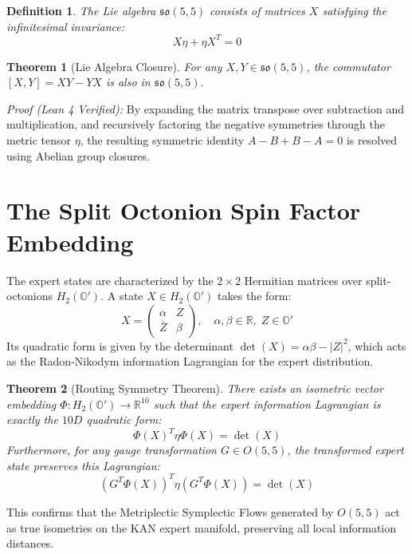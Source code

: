\documentclass[12pt,a4paper]{article}
\newtheorem{theorem}{Theorem}
\newtheorem{definition}{Definition}
\begin{document}
\begin{definition}
The Lie algebra $\mathfrak{so}(5,5)$ consists of matrices $X$ satisfying the infinitesimal invariance:
\begin{equation}
X \eta + \eta X^T = 0
\end{equation}
\end{definition}

\begin{theorem}[Lie Algebra Closure]
For any $X, Y \in \mathfrak{so}(5,5)$, the commutator $[X, Y] = XY - YX$ is also in $\mathfrak{so}(5,5)$.
\end{theorem}
\textit{Proof (Lean 4 Verified):} By expanding the matrix transpose over subtraction and multiplication, and recursively factoring the negative symmetries through the metric tensor $\eta$, the resulting symmetric identity $A - B + B - A = 0$ is resolved using Abelian group closures.

\section{The Split Octonion Spin Factor Embedding}
The expert states are characterized by the $2 \times 2$ Hermitian matrices over split-octonions $H_2(\mathbb{O}')$. A state $X \in H_2(\mathbb{O}')$ takes the form:
\begin{equation}
X = \begin{pmatrix} \alpha & Z \\ \bar{Z} & \beta \end{pmatrix}, \quad \alpha, \beta \in \mathbb{R}, \; Z \in \mathbb{O}'
\end{equation}
Its quadratic form is given by the determinant $\det(X) = \alpha\beta - |Z|^2$, which acts as the Radon-Nikodym information Lagrangian for the expert distribution.

\begin{theorem}[Routing Symmetry Theorem]
There exists an isometric vector embedding $\Phi: H_2(\mathbb{O}') \to \mathbb{R}^{10}$ such that the expert information Lagrangian is exactly the $10D$ quadratic form:
\begin{equation}
\Phi(X)^T \eta \Phi(X) = \det(X)
\end{equation}
Furthermore, for any gauge transformation $G \in O(5,5)$, the transformed expert state preserves this Lagrangian:
\begin{equation}
(G^T \Phi(X))^T \eta (G^T \Phi(X)) = \det(X)
\end{equation}
\end{theorem}
This confirms that the Metriplectic Symplectic Flows generated by $O(5,5)$ act as true isometries on the KAN expert manifold, preserving all local information distances.
\end{document}
